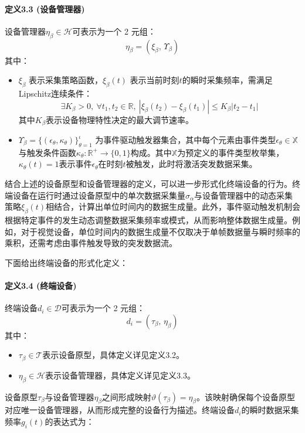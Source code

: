 \paragraph{定义3.3 (设备管理器)} 设备管理器$\eta_\beta \in \mathcal{H}$可表示为一个 2 元组：
\[
\eta_\beta = (\xi_\beta,\, \Upsilon_\beta)
\]
其中：
\begin{itemize}
    \item $\xi_\beta$ 表示采集策略函数，$\xi_\beta(t)$ 表示当前时刻$t$的瞬时采集频率，需满足Lipschitz连续条件：
        \[
        \exists K_\beta > 0,\ \forall t_1, t_2 \in \mathbb{R},\ |\xi_\beta(t_2) - \xi_\beta(t_1)| \leq K_\beta |t_2 - t_1|
        \]
        其中$K_\beta$表示设备物理特性决定的最大调节速率。
    \item $\Upsilon_\beta = \{(\epsilon_\theta, \kappa_\theta)\}_{\theta=1}^{\iota}$ 为事件驱动触发器集合，其中每个元素由事件类型$\epsilon_\theta \in \mathbb{X}$与触发条件函数$\kappa_\theta: \mathbb{R}^+ \to \{0,1\}$构成。其中$\mathbb{X}$为预定义的事件类型枚举集，$\kappa_\theta(t)=1$表示事件$\epsilon_\theta$在时刻$t$被触发，此时将激活突发数据采集。
\end{itemize}

结合上述的设备原型和设备管理器的定义，可以进一步形式化终端设备的行为。终端设备在运行时通过设备原型中的单次数据采集量$\sigma_\alpha$与设备管理器中的动态采集策略$\xi_\beta(t)$相结合，计算出单位时间内的数据生成量。此外，事件驱动触发机制会根据特定事件的发生动态调整数据采集频率或模式，从而影响整体数据生成量。例如，对于视觉设备，单位时间内的数据生成量不仅取决于单帧数据量与瞬时频率的乘积，还需考虑由事件触发导致的突发数据流。

下面给出终端设备的形式化定义：

\paragraph{定义3.4 (终端设备)} 终端设备$d_i \in \mathcal{D}$可表示为一个 2 元组：
\[
d_i = (\tau_\beta,\, \eta_\beta)
\]
其中：
\begin{itemize}
    \item $\tau_\beta \in \mathcal{T}$表示设备原型，具体定义详见定义3.2。
    \item $\eta_\beta \in \mathcal{H}$表示设备管理器，具体定义详见定义3.3。
\end{itemize}

设备原型$\tau_\beta$与设备管理器$\eta_\beta$之间形成映射$\vartheta(\tau_\beta) = \eta_\beta$。该映射确保每个设备原型对应唯一设备管理器，从而形成完整的设备行为描述。终端设备$d_i$的瞬时数据采集频率$g_i(t)$的表达式为：

